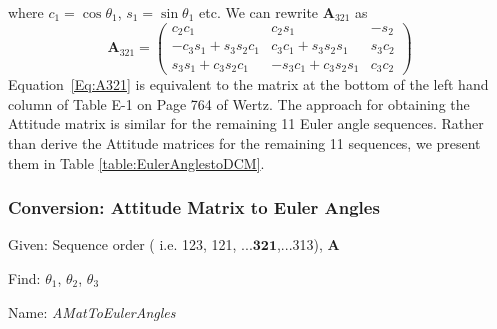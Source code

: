 %
where $c_1 =\cos{\theta_1}$, $s_1 = \sin{\theta_1}$ etc.  We can
rewrite $\mathbf{A}_{321} $ as
%
\begin{equation}
    \mathbf{A}_{321} =
        \begin{pmatrix}
             c_2 c_1        &      c_2 s_1        & -s_2    \\
        -c_3s_1 + s_3s_2c_1 &  c_3c_1 + s_3s_2s_1 &  s_3c_2 \\
         s_3s_1 + c_3s_2c_1 & -s_3c_1 + c_3s_2s_1 &  c_3c_2
     \end{pmatrix}
     \label{Eq:A321}
\end{equation}
%
Equation~\ref{Eq:A321} is equivalent to the matrix at the bottom of
the left hand column of Table E-1 on Page 764 of Wertz.  The approach for
obtaining the Attitude matrix is similar for the remaining 11 Euler angle
sequences.  Rather than derive the Attitude matrices for the remaining 11
sequences, we present them in Table \ref{table:EulerAnglestoDCM}.

\subsubsection{Conversion: Attitude Matrix to Euler Angles}
\label{sec:AttitudeMatrixtoEulerAngles}

Given: Sequence order  ( i.e. 123, 121, ...$\boldsymbol{321}$,...313), $\mathbf{A}$

\noindent Find:  $\theta_1$, $\theta_2$, $\theta_3$

\noindent Name:  \emph{AMatToEulerAngles}

